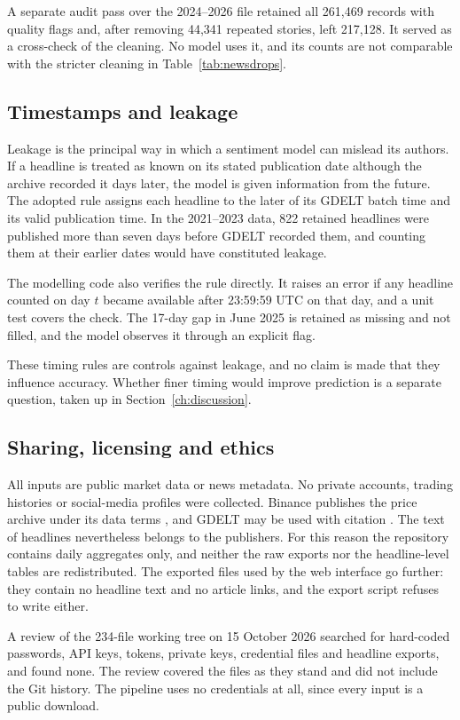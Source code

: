 A separate audit pass over the 2024--2026 file retained all 261,469 records with quality flags and, after removing 44,341 repeated stories, left 217,128. It served as a cross-check of the cleaning. No model uses it, and its counts are not comparable with the stricter cleaning in Table~\ref{tab:newsdrops}.

\subsection{Timestamps and leakage}
Leakage is the principal way in which a sentiment model can mislead its authors. If a headline is treated as known on its stated publication date although the archive recorded it days later, the model is given information from the future. The adopted rule assigns each headline to the later of its GDELT batch time and its valid publication time. In the 2021--2023 data, 822 retained headlines were published more than seven days before GDELT recorded them, and counting them at their earlier dates would have constituted leakage.

The modelling code also verifies the rule directly. It raises an error if any headline counted on day $t$ became available after 23:59:59 UTC on that day, and a unit test covers the check. The 17-day gap in June 2025 is retained as missing and not filled, and the model observes it through an explicit flag.

These timing rules are controls against leakage, and no claim is made that they influence accuracy. Whether finer timing would improve prediction is a separate question, taken up in Section~\ref{ch:discussion}.

\subsection{Sharing, licensing and ethics}
All inputs are public market data or news metadata. No private accounts, trading histories or social-media profiles were collected. Binance publishes the price archive under its data terms \cite{binanceterms}, and GDELT may be used with citation \cite{gdeltterms}. The text of headlines nevertheless belongs to the publishers. For this reason the repository contains daily aggregates only, and neither the raw exports nor the headline-level tables are redistributed. The exported files used by the web interface go further: they contain no headline text and no article links, and the export script refuses to write either.

A review of the 234-file working tree on 15 October 2026 searched for hard-coded passwords, API keys, tokens, private keys, credential files and headline exports, and found none. The review covered the files as they stand and did not include the Git history. The pipeline uses no credentials at all, since every input is a public download.

